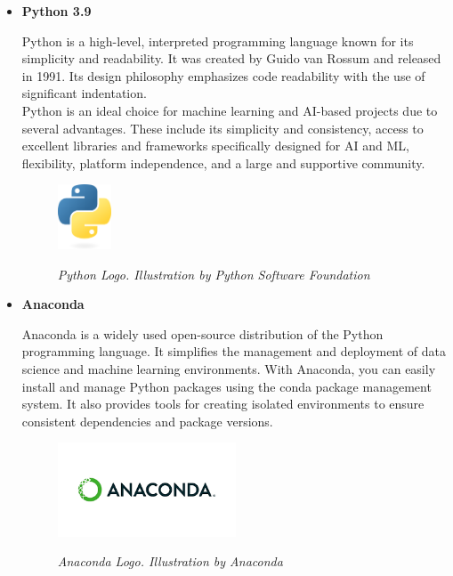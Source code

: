 \begin{itemize}
  \item \textbf{Python 3.9}

    Python  is a high-level, interpreted
    programming language known for its simplicity and readability. It was
    created by Guido van Rossum and released in 1991. Its design philosophy
    emphasizes code readability with the use of significant indentation. \\

    Python is an ideal choice for machine learning and AI-based projects due to
    several advantages. These include its simplicity and consistency, access to
    excellent libraries and frameworks specifically designed for AI and ML,
    flexibility, platform independence, and a large and supportive community.

    \newpage

    \begin{figure}[H]
      \centering
      \includegraphics[width=0.15\textwidth]{imatges/studies_and_decisions/python-logo-only.png}
      \caption[Python Logo]{\textit{Python Logo. Illustration by Python Software Foundation}}
      {\label{fig:python-logo}}
    \end{figure}

  \item \textbf{Anaconda}

    Anaconda  is a widely used open-source distribution of the Python programming language. It simplifies the management and deployment of data science and machine learning environments. With Anaconda, you can easily install and manage Python packages using the conda package management system. It also provides tools for creating isolated environments to ensure consistent dependencies and package versions.

    \begin{figure}[H]
      \centering
      \begin{adjustbox}{trim=0cm 1cm 0cm 1cm, clip}
        \includegraphics[width=0.5\textwidth]{imatges/studies_and_decisions/anaconda-logo.png}
      \end{adjustbox}
      \caption[Anaconda Logo]{\textit{Anaconda Logo. Illustration by Anaconda}}
      {\label{fig:anaconda-logo}}
    \end{figure}


\end{itemize}
